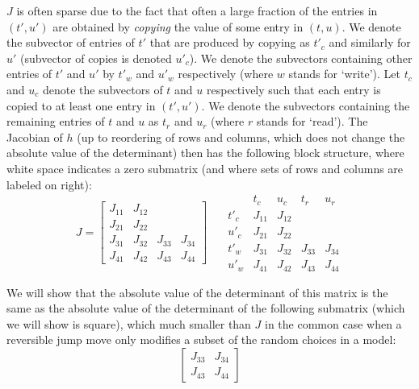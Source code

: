 \documentclass{article}
\begin{document}
$J$ is often sparse due to the fact that often a large fraction of the entries in $(t', u')$ are obtained by \emph{copying} the value of some entry in $(t, u)$.
We denote the subvector of entries of $t'$ that are produced by copying as $t'_c$ and similarly for $u'$ (subvector of copies is denoted $u'_c$).
We denote the subvectors containing other entries of $t'$ and $u'$ by $t'_w$ and $u'_w$ respectively (where $w$ stands for `write').
Let $t_c$ and $u_c$ denote the subvectors of $t$ and $u$ respectively such that each entry is copied to at least one entry in $(t', u')$.
We denote the subvectors containing the remaining entries of $t$ and $u$ as $t_r$ and $u_r$ (where $r$ stands for `read').
The Jacobian of $h$ (up to reordering of rows and columns, which does not change the absolute value of the determinant) then has the following block structure, where white space indicates a zero submatrix (and where sets of rows and columns are labeled on right):
\[
J = \left[
\begin{array}{cccc}
J_{11}  &   J_{12}  &     &   \\
J_{21}  &   J_{22}  &     &   \\
J_{31}  &   J_{32}  &   J_{33}  &   J_{34}\\
J_{41}  &   J_{42}  &   J_{43} &   J_{44}
\end{array}
\right]
\;\;\;\;\;
\begin{array}{c|cccc}
&       t_c    &   u_c &   t_r &   u_r\\
\hline
t'_c  &  J_{11}  &   J_{12}  &     &   \\
u'_c  &  J_{21}  &   J_{22}  &     &   \\
t'_w  &  J_{31}  &   J_{32}  &   J_{33}  &   J_{34}\\
u'_w  &  J_{41}  &   J_{42}  &   J_{43} &   J_{44}
\end{array}
\]

We will show that the absolute value of the determinant of this matrix is the same as the absolute value of the determinant of the following submatrix (which we will show is square), which much smaller than $J$ in the common case when a reversible jump move only modifies a subset of the random choices in a model:
\[
\left[
\begin{array}{cc}
J_{33}  &   J_{34}\\
J_{43} &   J_{44}
\end{array}
\right]
\]
\end{document}
